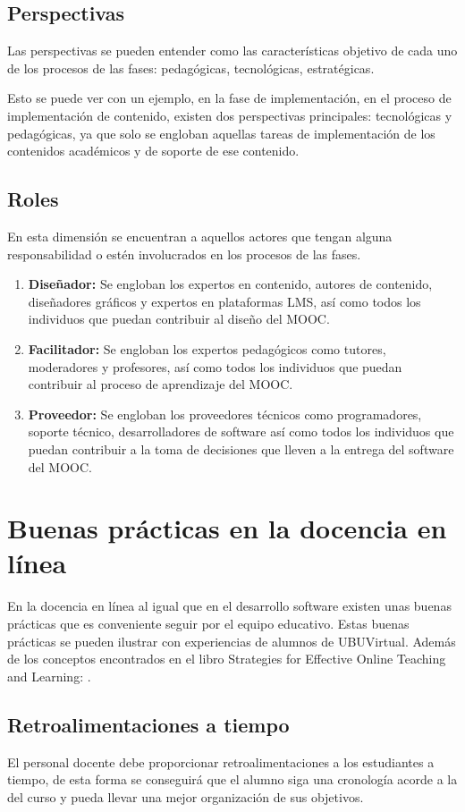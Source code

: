 \subsection{Perspectivas}
Las perspectivas se pueden entender como las características objetivo de cada uno de los procesos de las fases: pedagógicas, tecnológicas, estratégicas.

Esto se puede ver con un ejemplo, en la fase de implementación, en el proceso de implementación de contenido, existen dos perspectivas principales: tecnológicas y pedagógicas, ya que solo se engloban aquellas tareas de implementación de los contenidos académicos y de soporte de ese contenido.

\subsection{Roles}
En esta dimensión se encuentran a aquellos actores que tengan alguna responsabilidad o estén involucrados en los procesos de las fases.
\begin{enumerate}
    \item \textbf{Diseñador:} Se engloban los expertos en contenido, autores de contenido, diseñadores gráficos y expertos en plataformas LMS, así como todos los individuos que puedan contribuir al diseño del MOOC.
    \item \textbf{Facilitador:} Se engloban los expertos pedagógicos como tutores, moderadores y profesores, así como todos los individuos que puedan contribuir al proceso de aprendizaje del MOOC.
    \item \textbf{Proveedor:} Se engloban los proveedores técnicos como programadores, soporte técnico, desarrolladores de software así como todos los individuos que puedan contribuir a la toma de decisiones que lleven a la entrega del software del MOOC.
\end{enumerate}

\section{Buenas prácticas en la docencia en línea}
En la docencia en línea al igual que en el desarrollo software existen unas buenas prácticas que es conveniente seguir por el equipo educativo. Estas buenas prácticas se pueden ilustrar con experiencias de alumnos de UBUVirtual\cite{ubu-virtual}. Además de los conceptos encontrados en el libro Strategies for Effective Online Teaching and Learning: \cite{inbook}.

\subsection{Retroalimentaciones a tiempo}
El personal docente debe proporcionar retroalimentaciones a los estudiantes a tiempo, de esta forma se conseguirá que el alumno siga una cronología acorde a la del curso y pueda llevar una mejor organización de sus objetivos.

